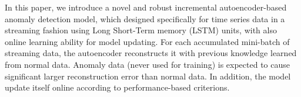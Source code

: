 In this paper, we introduce a novel and robust incremental autoencoder-based anomaly detection model, which designed specifically for time series data in a streaming fashion using Long Short-Term memory (LSTM) units, with also online learning ability for model updating.  For each accumulated mini-batch of streaming data, the autoencoder reconstructs it with previous knowledge learned from normal data. Anomaly data (never used for training) is expected to cause significant larger reconstruction error than normal data. In addition, the model update itself online according to performance-based criterions.